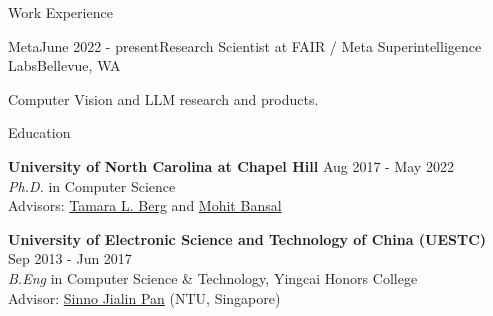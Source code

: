 \documentclass{resume} %
\begin{document}

\begin{rSection}{Work Experience}


    \begin{rSubsection}{Meta}{June 2022 - present}{Research Scientist at FAIR / Meta Superintelligence Labs}{Bellevue, WA}
        \item Computer Vision and LLM research and products.
    \end{rSubsection}

    \end{rSection}


\begin{rSection}{Education}

{\bf University of North Carolina at Chapel Hill} \hfill {Aug 2017  -  May 2022} \\
{\sl Ph.D.} in Computer Science \\
Advisors: \href{http://www.tamaraberg.com/}{Tamara L. Berg} and \href{http://www.cs.unc.edu/~mbansal/}{Mohit Bansal}

{\bf University of Electronic Science and Technology of China (UESTC)} \hfill {Sep 2013 - Jun 2017} \\
{\sl B.Eng} in Computer Science \& Technology, Yingcai Honors College\\
Advisor: \href{https://personal.ntu.edu.sg/sinnopan/}{Sinno Jialin Pan} (NTU, Singapore)
\end{rSection}

\end{document}
